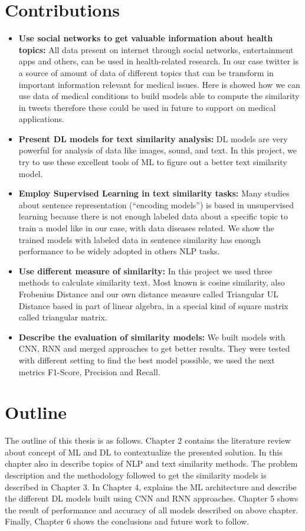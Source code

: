\documentclass[12pt]{report}
\begin{document}
	\section{Contributions}
	\begin{itemize}[nolistsep]
		\item \textbf{Use social networks to get valuable information about health topics:} All data present on internet through social networks, entertainment apps and others, can be used in health-related research. In our case twitter is a source of amount of data of different topics that can be transform in important information relevant for medical issues. Here is showed how we can use data of medical conditions to build models able to compute the similarity in tweets therefore these could be used in future to support on medical applications. 
		\item \textbf{Present \ac{DL} models for text similarity analysis:} \ac{DL} models are very powerful for analysis of data like images, sound, and text. In this project, we try to use these excellent tools of \ac{ML} to figure out a better text similarity model.
		\item \textbf{Employ Supervised Learning in text similarity tasks:} Many studies about sentence representation (``encoding models'') is based in unsupervised learning because there is not enough labeled data about a specific topic to train a model like in our case, with data diseases related. We show the trained models with labeled data in sentence similarity has enough performance to be widely adopted in others \ac{NLP} tasks.
		\item \textbf{Use different measure of similarity:} In this project we used three methods to calculate similarity text. Most known is cosine similarity, also Frobenius Distance and our own distance measure called Triangular UL Distance based in part of linear algebra, in a special kind of square matrix called triangular matrix.
		\item \textbf{Describe the evaluation of similarity models: } We built models with \ac{CNN}, \ac{RNN} and merged approaches to get better results. They were tested with different setting to find the best model possible, we used the next metrics F1-Score, Precision and Recall.
	\end{itemize}
	
	\section{Outline}
	The outline of this thesis is as follows. Chapter 2 contains the literature review about concept of \ac{ML} and \ac{DL} to contextualize the presented solution. In this chapter also in describe topics of \ac{NLP} and text similarity methods. The problem description and the methodology followed to get the similarity models is described in Chapter 3. In Chapter 4, explains the \ac{ML} architecture and describe the different \ac{DL} models built using \ac{CNN} and \ac{RNN} approaches. Chapter 5 shows the result of performance and accuracy of all models described on above chapter. Finally, Chapter 6 shows the conclusions and future work to follow.
	
\end{document}
